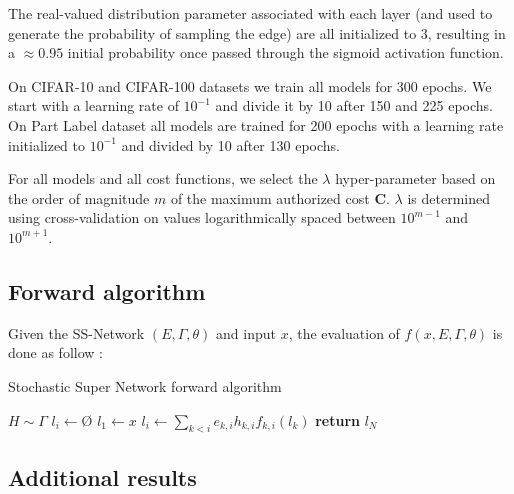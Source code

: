 \documentclass[10pt,twocolumn,letterpaper]{article}
\begin{document}
The real-valued distribution parameter associated with each layer (and used to generate the probability of sampling the edge) are all initialized to 3, resulting in a $\approx 0.95$ initial probability once passed through the sigmoid activation function.

On CIFAR-10 and CIFAR-100 datasets we train all models for 300 epochs. We start with a learning rate of $10^{-1}$ and divide it by 10 after 150 and 225 epochs. On Part Label dataset all models are trained for 200 epochs with a learning rate initialized to $10^{-1}$ and divided by 10 after 130 epochs.

For all models and all cost functions, we select the $\lambda$ hyper-parameter based on the order of magnitude $m$ of the maximum authorized cost $\mathbf{C}$. $\lambda$ is determined using cross-validation on values logarithmically spaced between $10^{m-1}$ and $10^{m+1}$.

\newpage

\subsection*{Forward algorithm}
Given the SS-Network $(E,\Gamma, \theta)$ and input $x$, the evaluation of $f(x,E, \Gamma,\theta)$ is done as follow :

\begin{algorithm}[ht] 
\caption{Stochastic Super Network forward algorithm}
\begin{algorithmic}[1]
\State $H \sim \Gamma$ 
\State $l_i \gets $\O 
\EndFor
\State $l_1 \gets x$
\State $l_i \gets \sum\limits_{k<i} e_{k,i} h_{k,i} f_{k,i}(l_k)$
\EndFor 
\State \textbf{return} $l_N$
\EndProcedure
\end{algorithmic}
\label{algo2}
\end{algorithm}


\subsection*{Additional results}








\end{document}
